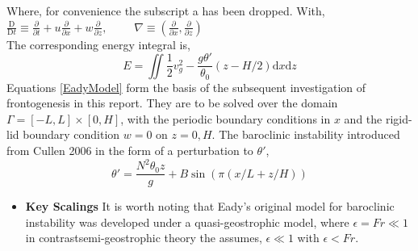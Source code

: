 Where, for convenience the subscript a has been dropped. With,\\
$\frac{\mathrm{D}}{\mathrm{D}t} \equiv \frac{\partial}{\partial t} + u\frac{\partial}{\partial x} + w\frac{\partial}{\partial z},\qquad$ 
$\nabla \equiv \left(\frac{\partial}{\partial x},\frac{\partial}{\partial z}\right)$\\
\linebreak
The corresponding energy integral is,
\begin{equation}
	E = \iint \frac{1}{2}v_g^2 - \frac{g\theta'}{\theta_0}\left(z - H/2\right)\textrm{d}x\textrm{d}z
\end{equation}
Equations \ref{EadyModel} form the basis of the subsequent investigation of frontogenesis in this report. They are to be solved over the domain $\Gamma = [-L,L] \times [0,H]$, with the periodic boundary conditions in $x$ and the rigid-lid boundary condition $w = 0$ on $z = 0,H$. The baroclinic instability introduced from Cullen 2006 \cite{Cullen2006a} in the form of a perturbation to $\theta'$, 
\begin{equation}
	\theta' = \frac{N^2\theta_0 z}{g} + B\sin\left(\pi\left(x/L + z/H\right)\right)
\end{equation}
\begin{itemize}
	\item \textbf{Key Scalings}
	It is worth noting that Eady's original model for baroclinic instability was developed under a quasi-geostrophic model, where $\epsilon = Fr \ll 1$ in contrastsemi-geostrophic theory the assumes, $\epsilon \ll 1$ with $\epsilon < Fr$.
\end{itemize}
